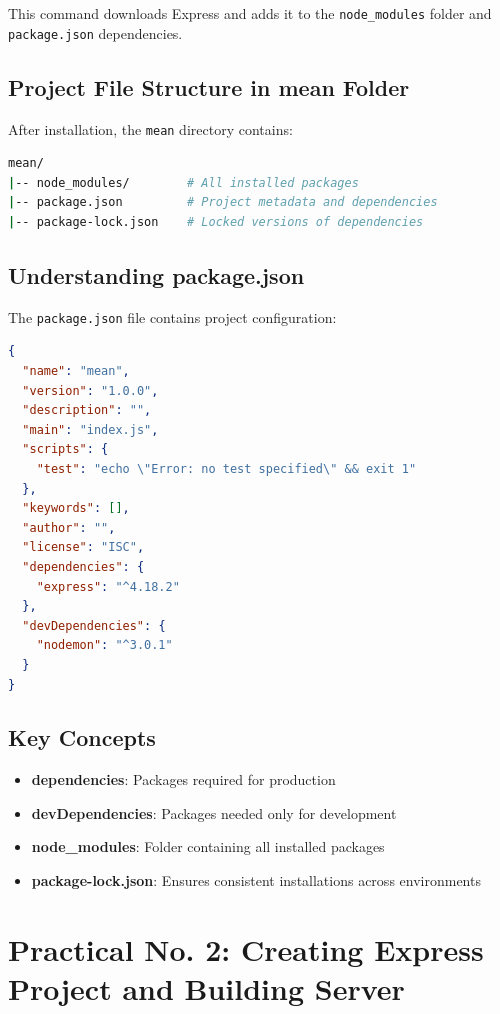 \documentclass[12pt,a4paper]{article}
\begin{document}
This command downloads Express and adds it to the \texttt{node\_modules} folder and \texttt{package.json} dependencies.


\subsection{Project File Structure in mean Folder}

After installation, the \texttt{mean} directory contains:

\begin{lstlisting}[language=bash]
mean/
|-- node_modules/        # All installed packages
|-- package.json         # Project metadata and dependencies
|-- package-lock.json    # Locked versions of dependencies
\end{lstlisting}

\subsection{Understanding package.json}

The \texttt{package.json} file contains project configuration:

\begin{lstlisting}[language=JSON]
{
  "name": "mean",
  "version": "1.0.0",
  "description": "",
  "main": "index.js",
  "scripts": {
    "test": "echo \"Error: no test specified\" && exit 1"
  },
  "keywords": [],
  "author": "",
  "license": "ISC",
  "dependencies": {
    "express": "^4.18.2"
  },
  "devDependencies": {
    "nodemon": "^3.0.1"
  }
}
\end{lstlisting}

\subsection{Key Concepts}

\begin{itemize}
    \item \textbf{dependencies}: Packages required for production
    \item \textbf{devDependencies}: Packages needed only for development
    \item \textbf{node\_modules}: Folder containing all installed packages
    \item \textbf{package-lock.json}: Ensures consistent installations across environments
\end{itemize}

\newpage

\section{Practical No. 2: Creating Express Project and Building Server}
\end{document}
